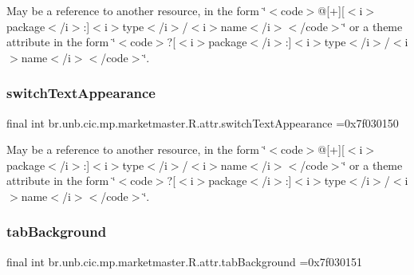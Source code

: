 May be a reference to another resource, in the form \char`\"{}$<$code$>$@\mbox{[}+\mbox{]}\mbox{[}$<$i$>$package$<$/i$>$\+:\mbox{]}$<$i$>$type$<$/i$>$/$<$i$>$name$<$/i$>$$<$/code$>$\char`\"{} or a theme attribute in the form \char`\"{}$<$code$>$?\mbox{[}$<$i$>$package$<$/i$>$\+:\mbox{]}$<$i$>$type$<$/i$>$/$<$i$>$name$<$/i$>$$<$/code$>$\char`\"{}. \mbox{\label{classbr_1_1unb_1_1cic_1_1mp_1_1marketmaster_1_1R_1_1attr_a71454299a7f86f8d6d67443335771a2a}} 
\subsubsection{\texorpdfstring{switch\+Text\+Appearance}{switchTextAppearance}}
{\footnotesize\ttfamily final int br.\+unb.\+cic.\+mp.\+marketmaster.\+R.\+attr.\+switch\+Text\+Appearance =0x7f030150\hspace{0.3cm}{\ttfamily [static]}}

May be a reference to another resource, in the form \char`\"{}$<$code$>$@\mbox{[}+\mbox{]}\mbox{[}$<$i$>$package$<$/i$>$\+:\mbox{]}$<$i$>$type$<$/i$>$/$<$i$>$name$<$/i$>$$<$/code$>$\char`\"{} or a theme attribute in the form \char`\"{}$<$code$>$?\mbox{[}$<$i$>$package$<$/i$>$\+:\mbox{]}$<$i$>$type$<$/i$>$/$<$i$>$name$<$/i$>$$<$/code$>$\char`\"{}. \mbox{\label{classbr_1_1unb_1_1cic_1_1mp_1_1marketmaster_1_1R_1_1attr_a38ad7cfc48c2057e84b930cb113b23b7}} 
\subsubsection{\texorpdfstring{tab\+Background}{tabBackground}}
{\footnotesize\ttfamily final int br.\+unb.\+cic.\+mp.\+marketmaster.\+R.\+attr.\+tab\+Background =0x7f030151\hspace{0.3cm}{\ttfamily [static]}}

